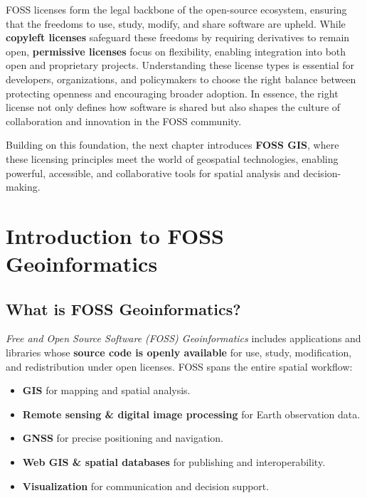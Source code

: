 \documentclass[
  11pt,
  letterpaper,
]{book}
\providecommand{\tightlist}{%
  \setlength{\itemsep}{0pt}\setlength{\parskip}{0pt}}
\begin{document}
FOSS licenses form the legal backbone of the open-source ecosystem,
ensuring that the freedoms to use, study, modify, and share software are
upheld. While \textbf{copyleft licenses} safeguard these freedoms by
requiring derivatives to remain open, \textbf{permissive licenses} focus
on flexibility, enabling integration into both open and proprietary
projects. Understanding these license types is essential for developers,
organizations, and policymakers to choose the right balance between
protecting openness and encouraging broader adoption. In essence, the
right license not only defines how software is shared but also shapes
the culture of collaboration and innovation in the FOSS community.

Building on this foundation, the next chapter introduces \textbf{FOSS
GIS}, where these licensing principles meet the world of geospatial
technologies, enabling powerful, accessible, and collaborative tools for
spatial analysis and decision-making.

\chapter{Introduction to FOSS
Geoinformatics}\label{introduction-to-foss-geoinformatics}

\section{What is FOSS
Geoinformatics?}\label{what-is-foss-geoinformatics}

\emph{Free and Open Source Software (FOSS) Geoinformatics} includes
applications and libraries whose \textbf{source code is openly
available} for use, study, modification, and redistribution under open
licenses. FOSS spans the entire spatial workflow:

\begin{itemize}
\tightlist
\item
  \textbf{GIS} for mapping and spatial analysis.\\
\item
  \textbf{Remote sensing \& digital image processing} for Earth
  observation data.\\
\item
  \textbf{GNSS} for precise positioning and navigation.\\
\item
  \textbf{Web GIS \& spatial databases} for publishing and
  interoperability.\\
\item
  \textbf{Visualization} for communication and decision support.
\end{itemize}
\end{document}
